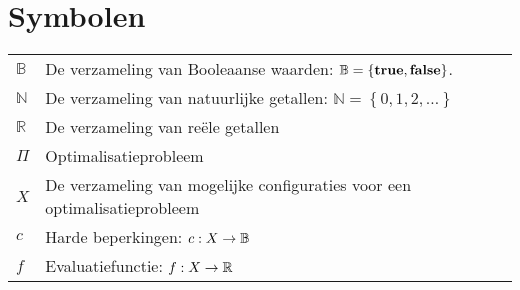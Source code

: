 \documentclass[master=elt,masteroption=ge]{kulemt}
\begin{document}
\section*{Symbolen}
\begin{flushleft}
  \renewcommand{\arraystretch}{1.1}
  \begin{tabularx}{\textwidth}{@{}p{22mm}X@{}}
    $\mathbb{B}$	& De verzameling van Booleaanse waarden: $\mathbb{B}=\left\{\mbox{\textbf{true}},\mbox{\textbf{false}}\right\}$. \\
    $\mathbb{N}$	& De verzameling van natuurlijke getallen: $\mathbb{N}=\left\{0,1,2,\ldots\right\}$ \\
    $\mathbb{R}$	& De verzameling van re\"ele getallen\\
    $\Pi$		& Optimalisatieprobleem\\
    $X$			& De verzameling van mogelijke configuraties voor een optimalisatieprobleem\\
    $c$			& Harde beperkingen: $c:X\rightarrow\mathbb{B}$\\
    $f$			& Evaluatiefunctie: $f:X\rightarrow\mathbb{R}$
  \end{tabularx}
\end{flushleft}

\mainmatter







\appendixpage*          %
\appendix



\backmatter


\end{document}
